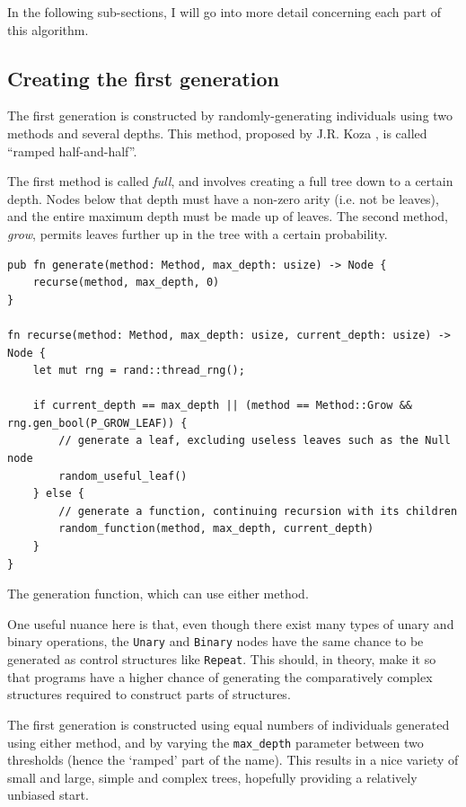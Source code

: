 \documentclass{report}
\newenvironment{code}{\captionsetup{type=listing}}{}
\begin{document}
In the following sub-sections, I will go into more detail concerning each part of this algorithm.

\subsection{Creating the first generation}

The first generation is constructed by randomly-generating individuals using two methods and several depths. This method, proposed by J.R. Koza \cite{koza}, is called ``ramped half-and-half''.

The first method is called \emph{full}, and involves creating a full tree down to a certain depth. Nodes below that depth must have a non-zero arity (i.e. not be leaves), and the entire maximum depth must be made up of leaves. The second method, \emph{grow}, permits leaves further up in the tree with a certain probability.

\begin{code}
    \begin{verbatim}
pub fn generate(method: Method, max_depth: usize) -> Node {
    recurse(method, max_depth, 0)
}

fn recurse(method: Method, max_depth: usize, current_depth: usize) -> Node {
    let mut rng = rand::thread_rng();

    if current_depth == max_depth || (method == Method::Grow && rng.gen_bool(P_GROW_LEAF)) {
        // generate a leaf, excluding useless leaves such as the Null node
        random_useful_leaf()
    } else {
        // generate a function, continuing recursion with its children
        random_function(method, max_depth, current_depth)
    }
}
    \end{verbatim}
    \caption{The generation function, which can use either method.}
    \label{lst:gen_function}
\end{code}

One useful nuance here is that, even though there exist many types of unary and binary operations, the \verb|Unary| and \verb|Binary| nodes have the same chance to be generated as control structures like \verb|Repeat|. This should, in theory, make it so that programs have a higher chance of generating the comparatively complex structures required to construct parts of structures.

The first generation is constructed using equal numbers of individuals generated using either method, and by varying the \verb|max_depth| parameter between two thresholds (hence the `ramped' part of the name). This results in a nice variety of small and large, simple and complex trees, hopefully providing a relatively unbiased start.
\end{document}
